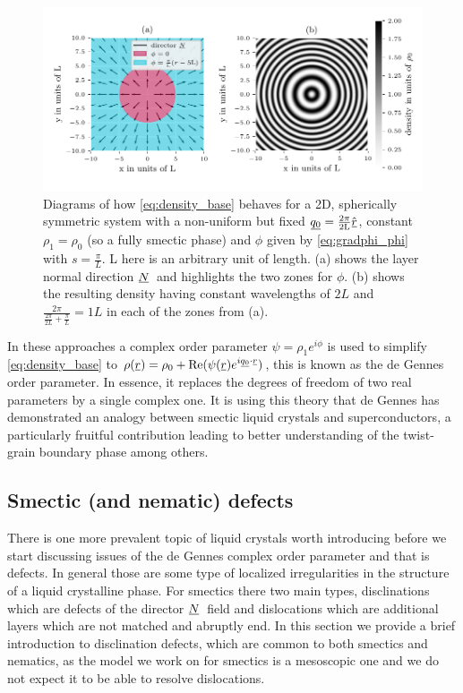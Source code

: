 \documentclass[12pt]{article}
\newcommand{\suf}[2]{\stackunder[0.5pt]{\stackunder[1pt]{\ensuremath{#1}}{\rule{\widthof{\ensuremath{#2}}*\real{0.9}}{.1ex}}}{}}
\newcommand{\su}[1]{\suf{#1}{#1}}
\newcommand{\ssu}[1]{\scriptsize\su{#1}\normalsize}
\newcommand{\NN}{\ensuremath{\su{N}}}
\begin{document}
        \begin{figure}[t]
            \begin{center}
                \includegraphics{figures/misc/wave_phi_example.pdf}
            \end{center}
            \caption{
                Diagrams of how \cref{eq:density_base} behaves for a 2D, spherically symmetric system with a non-uniform but fixed $\su{q_0} = \frac{2\pi}{2\si{L}}\hat{\su{r}}$, constant $\rho_1 = \rho_0$ (so a fully smectic phase) and $\phi$ given by \cref{eq:gradphi_phi} with $s=\frac{\pi}{\si{L}}$.
                \si{L} here is an arbitrary unit of length.
                (a) shows the layer normal direction \NN\ and highlights the two zones for $\phi$.
                (b) shows the resulting density having constant wavelengths of $2\si{L}$ and $\frac{2\pi}{\frac{2\pi}{2\si{L}}+\frac{\pi}{\si{L}}} = 1\si{L}$ in each of the zones from (a).
            }\label{fig:gradphi}
        \end{figure}

        In these approaches a complex order parameter $\psi=\rho_1e^{i\phi}$ is used to simplify \cref{eq:density_base} to $\rho(\su{r}) = \rho_0 + \Re(\psi(\su{r}) e^{i\ssu{q_0}\cdot\ssu{r}})$, this is known as the de Gennes order parameter.
        In essence, it replaces the degrees of freedom of two real parameters by a single complex one.
        It is using this theory that de Gennes has demonstrated an analogy between smectic liquid crystals and superconductors\cite{degennesAnalogySuperconductorsSmectics1972}, a particularly fruitful contribution leading to better understanding of the twist-grain boundary phase\cite{lubenskyTwistgrainboundaryPhasesNematic1990} among others.

    \subsection{Smectic (and nematic) defects}
    There is one more prevalent topic of liquid crystals worth introducing before we start discussing issues of the de Gennes complex order parameter and that is defects.
    In general those are some type of localized irregularities in the structure of a liquid crystalline phase.
    For smectics there two main types, disclinations which are defects of the director \NN\ field and dislocations which are additional layers which are not matched and abruptly end.
    In this section we provide a brief introduction to disclination defects, which are common to both smectics and nematics, as the model we work on for smectics is a mesoscopic one and we do not expect it to be able to resolve dislocations.
\end{document}
